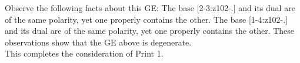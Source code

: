 \documentclass[final]{article}
\begin{document}
Observe the following facts about this GE:
The base [2-3:z102-.]  and its dual are of the same polarity, yet one properly contains the other.  The base [1-4:z102-.]  and its dual are of the same polarity, yet one properly contains the other.  These observations show that the GE above is degenerate.\\[0.1in]
This completes the consideration of Print 1.\\[0.1in]
\end{document}

